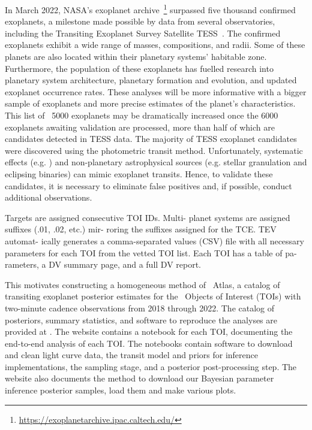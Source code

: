 \documentclass[floatfix,ApJL,twocolumn]{aastex631}
\begin{document}
In March 2022, NASA's exoplanet archive~\citep{Akeson:2013:PASP}\footnote{\href{https://exoplanetarchive.ipac.caltech.edu/}{https://exoplanetarchive.ipac.caltech.edu/}} surpassed five thousand confirmed exoplanets, a milestone made possible by data from several observatories, including the Transiting Exoplanet Survey Satellite TESS~\citep{Ricker:2015:JATIS}.
The confirmed exoplanets exhibit a wide range of masses, compositions, and radii.
Some of these planets are also located within their planetary systems' habitable zone.
Furthermore, the population of these exoplanets has fuelled research into planetary system architecture, planetary formation and evolution, and updated exoplanet occurrence rates.
These analyses will be more informative with a bigger sample of exoplanets and more precise estimates of the planet's characteristics.
This list of ~5000 exoplanets may be dramatically increased once the 6000 exoplanets awaiting validation are processed, more than half of which are candidates detected in TESS data.
The majority of TESS exoplanet candidates were discovered using the photometric transit method.
Unfortunately, systematic effects (e.g. ) and non-planetary astrophysical sources (e.g. stellar granulation and eclipsing binaries) can mimic exoplanet transits.
Hence, to validate these candidates, it is necessary to eliminate false positives and, if possible, conduct additional observations. 

Targets are assigned consecutive TOI IDs. Multi- planet systems are assigned suffixes (.01, .02, etc.) mir- roring the suffixes assigned for the TCE. TEV automat- ically generates a comma-separated values (CSV) file with all necessary parameters for each TOI from the vetted TOI list. Each TOI has a table of pa- rameters, a DV summary page, and a full DV report.


This motivates constructing a homogeneous method of \tess\ Atlas, a catalog of transiting exoplanet posterior estimates for the \red{\numAnalysed} \tess\ Objects of Interest (TOIs) with two-minute cadence observations from 2018 through 2022.
The catalog of posteriors, summary statistics, and software to reproduce the analyses are provided at \atlasUrl.
The website contains a \jupyter notebook for each TOI, documenting the end-to-end analysis of each TOI.
The notebooks contain software to download and clean light curve data, the transit model and priors for inference implementations, the \pymc sampling stage, and a posterior post-processing step.
The website also documents the method to download our Bayesian parameter inference posterior samples, load them and make various plots.
\end{document}
